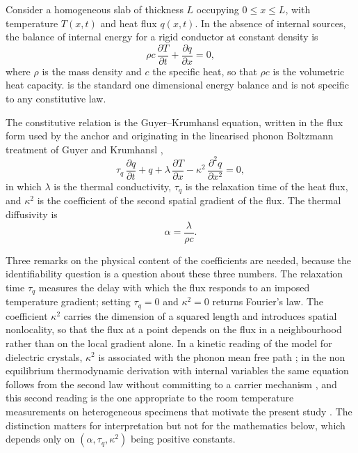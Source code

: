 \documentclass[preprint,12pt,a4paper]{elsarticle}
\theoremstyle{plain}
\theoremstyle{definition}
\theoremstyle{remark}
\newcommand{\tq}{\tau_{q}}
\newcommand{\kk}{\kappa^{2}}
\begin{document}
Consider a homogeneous slab of thickness $L$ occupying $0 \leq x \leq L$, with
temperature $T(x,t)$ and heat flux $q(x,t)$. In the absence of internal
sources, the balance of internal energy for a rigid conductor at constant
density is
%
\begin{equation}
  \rho c \, \frac{\partial T}{\partial t}
  + \frac{\partial q}{\partial x} = 0 ,
  \label{eq:energy}
\end{equation}
%
where $\rho$ is the mass density and $c$ the specific heat, so that $\rho c$ is
the volumetric heat capacity.  is the standard one dimensional
energy balance and is not specific to any constitutive law.

The constitutive relation is the Guyer--Krumhansl equation, written in the flux
form used by the anchor \cite{Kovacs2018} and originating in the linearised
phonon Boltzmann treatment of Guyer and Krumhansl
\cite{GuyerKrumhansl1966a,GuyerKrumhansl1966b},
%
\begin{equation}
  \tq \, \frac{\partial q}{\partial t}
  + q
  + \lambda \, \frac{\partial T}{\partial x}
  - \kk \, \frac{\partial^{2} q}{\partial x^{2}}
  = 0 ,
  \label{eq:gk}
\end{equation}
%
in which $\lambda$ is the thermal conductivity, $\tq$ is the relaxation time of
the heat flux, and $\kk$ is the coefficient of the second spatial gradient of
the flux. The thermal diffusivity is
%
\begin{equation}
  \alpha = \frac{\lambda}{\rho c} .
  \label{eq:alpha}
\end{equation}

Three remarks on the physical content of the coefficients are needed, because
the identifiability question is a question about these three numbers.
The relaxation time $\tq$ measures the delay with which the flux responds to an
imposed temperature gradient; setting $\tq = 0$ and $\kk = 0$ returns Fourier's
law. The coefficient $\kk$ carries the dimension of a squared length and
introduces spatial nonlocality, so that the flux at a point depends on the flux
in a neighbourhood rather than on the local gradient alone. In a kinetic
reading of the model for dielectric crystals, $\kk$ is associated with the
phonon mean free path \cite{GuyerKrumhansl1966b}; in the non equilibrium
thermodynamic derivation with internal variables the same equation follows from
the second law without committing to a carrier mechanism \cite{Van2001}, and
this second reading is the one appropriate to the room temperature
measurements on heterogeneous specimens that motivate the present study
\cite{Van2017,Feher2021sizeeffects}. The distinction matters for
interpretation but not for the mathematics below, which depends only on
$(\alpha, \tq, \kk)$ being positive constants.
\end{document}
